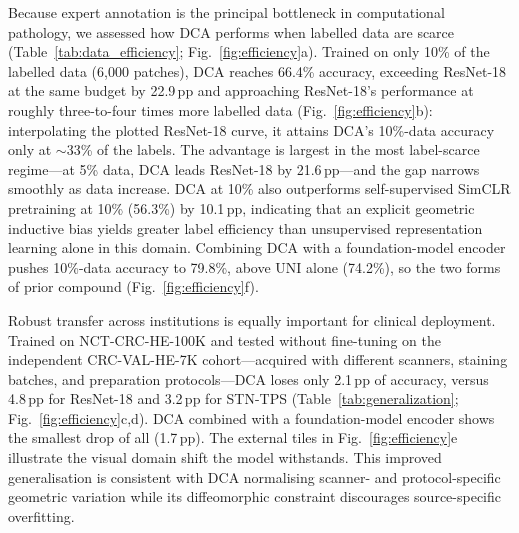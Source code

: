 Because expert annotation is the principal bottleneck in computational pathology,
we assessed how DCA performs when labelled data are scarce
(Table~\ref{tab:data_efficiency}; Fig.~\ref{fig:efficiency}a). Trained on only
10\% of the labelled data (6{,}000 patches), DCA reaches 66.4\% accuracy,
exceeding ResNet-18 at the same budget by 22.9\,pp and approaching ResNet-18's
performance at roughly three-to-four times more labelled data
(Fig.~\ref{fig:efficiency}b): interpolating the plotted ResNet-18 curve, it
attains DCA's 10\%-data accuracy only at $\sim$33\% of the labels. The advantage
is largest in the most label-scarce regime---at 5\% data, DCA leads ResNet-18 by
21.6\,pp---and the gap narrows smoothly as data increase. DCA at 10\% also
outperforms self-supervised SimCLR pretraining at 10\% (56.3\%) by 10.1\,pp,
indicating that an explicit geometric inductive bias yields greater label
efficiency than unsupervised representation learning alone in this domain.
Combining DCA with a foundation-model encoder pushes 10\%-data accuracy to 79.8\%,
above UNI alone (74.2\%), so the two forms of prior compound
(Fig.~\ref{fig:efficiency}f).

Robust transfer across institutions is equally important for clinical
deployment. Trained on NCT-CRC-HE-100K and tested without fine-tuning on the
independent CRC-VAL-HE-7K cohort---acquired with different scanners, staining
batches, and preparation protocols---DCA loses only 2.1\,pp of accuracy, versus
4.8\,pp for ResNet-18 and 3.2\,pp for STN-TPS (Table~\ref{tab:generalization};
Fig.~\ref{fig:efficiency}c,d). DCA combined with a foundation-model encoder shows
the smallest drop of all (1.7\,pp). The external tiles in
Fig.~\ref{fig:efficiency}e illustrate the visual domain shift the model
withstands. This improved generalisation is consistent with DCA normalising
scanner- and protocol-specific geometric variation while its diffeomorphic
constraint discourages source-specific overfitting.

